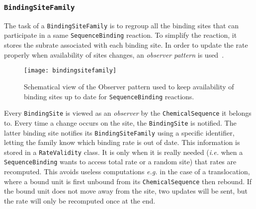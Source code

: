 \subsubsection{\texttt{BindingSiteFamily}}

The task of a \texttt{BindingSiteFamily} is to regroup all the binding sites that can participate in a same \texttt{SequenceBinding} reaction. To simplify the reaction, it stores the subrate associated with each binding site. In order to update the rate properly when availability of sites changes, an \emph{observer pattern} is used~. 

\begin{figure}[!h]
  \centering
  \texttt{[image: bindingsitefamily]}
  \caption{Schematical view of the Observer pattern used to keep availability of binding sites up to date for \texttt{SequenceBinding} reactions.}
  \label{fig:bsf}
\end{figure}

Every \texttt{BindingSite} is viewed as an \emph{observer} by the \texttt{ChemicalSequence} it belongs to. Every time a change occurs on the site, the \texttt{BindingSite} is notified. The latter binding site notifies its \texttt{BindingSiteFamily} using a specific identifier, letting the family know which binding rate is out of date. This information is stored in a \texttt{RateValidity} class. It is only when it is really needed (\textit{i.e.} when a \texttt{SequenceBinding} wants to access total rate or a random site) that rates are recomputed. This avoids useless computations \textit{e.g.} in the case of a translocation, where a bound unit is first unbound from its \texttt{ChemicalSequence} then rebound. If the bound unit does not move away from the site, two updates will be sent, but the rate will only be recomputed once at the end.
